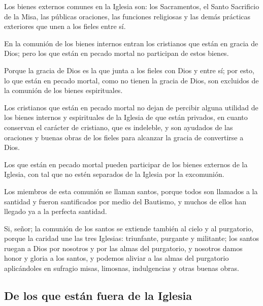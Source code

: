  Los bienes
externos comunes en la Iglesia son: los Sacramentos, el Santo Sacrificio de la
Misa, las públicas oraciones, las funciones religiosas y las demás prácticas
exteriores que unen a los fieles entre sí.

 En
la comunión de los bienes internos entran los cristianos que están en gracia de
Dios; pero los que están en pecado mortal no participan de estos bienes.

 Porque la gracia de Dios es la que junta a los fieles con Dios y entre sí;
por esto, lo que están en pecado mortal, como no tienen la gracia de Dios, son
excluidos de la comunión de los bienes espirituales.

 Los
cristianos que están en pecado mortal no dejan de percibir alguna utilidad de los
bienes internos y espirituales de la Iglesia de que están privados, en cuanto
conservan el carácter de cristiano, que es indeleble, y son ayudados de las
oraciones y buenas obras de los fieles para alcanzar la gracia de convertirse a Dios.

 Los que están en pecado mortal pueden participar de los
bienes externos de la Iglesia, con tal que no estén separados de la Iglesia por la
excomunión.

 Los miembros de esta comunión se llaman santos, porque todos
son llamados a la santidad y fueron santificados por medio del Bautismo, y
muchos de ellos han llegado ya a la perfecta santidad.

 Si, señor; la comunión de los santos se extiende también al cielo y al
purgatorio, porque la caridad une las tres Iglesias: triunfante, purgante y militante; los santos ruegan a Dios por nosotros y por las almas del purgatorio, y nosotros damos honor y gloria a los santos, y podemos aliviar a las almas del purgatorio aplicándoles en sufragio misas, limosnas, indulgencias y otras buenas obras.

\subsection{De los que están fuera de la Iglesia}

